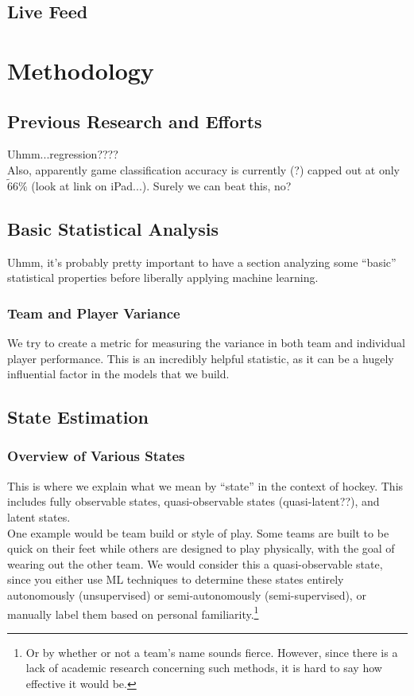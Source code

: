 \documentclass{notes}
\begin{document}
    \subsection{Live Feed}


  \section{Methodology}
    \subsection{Previous Research and Efforts}
      Uhmm...regression????\\

      Also, apparently game classification accuracy is currently (?) capped out at only $\tilde 66\%$ (look at link on iPad...).
      Surely we can beat this, no?

    \subsection{Basic Statistical Analysis}
      Uhmm, it's probably pretty important to have a section analyzing some ``basic'' statistical properties before liberally applying machine learning.

      \subsubsection{Team and Player Variance}
        We try to create a metric for measuring the variance in both team and individual player performance.
        This is an incredibly helpful statistic, as it can be a hugely influential factor in the models that we build.

    \subsection{State Estimation}

        \subsubsection{Overview of Various States}
          This is where we explain what we mean by ``state'' in the context of hockey.
          This includes fully observable states, quasi-observable states (quasi-latent??), and latent states.\\

          One example would be team build or style of play.
          Some teams are built to be quick on their feet while others are designed to play physically, with the goal of wearing out the other team.
          We would consider this a quasi-observable state, since you either use ML techniques to determine these states entirely autonomously (unsupervised) or semi-autonomously (semi-supervised), or manually label them based on personal familiarity.\footnote{Or by whether or not a team's name sounds fierce. However, since there is a lack of academic research concerning such methods, it is hard to say how effective it would be.}
\end{document}
